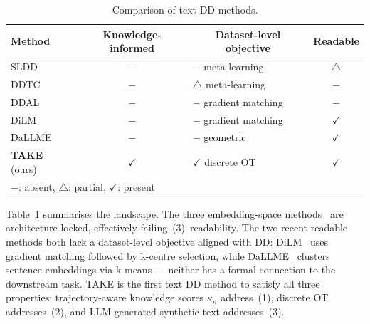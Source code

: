 \begin{table}[t] %
    \centering
    \caption{Comparison of text DD methods.}
    \label{ch5:tab:comparision-textdd-methods}
    \begin{tabular}{l c l c}
        \toprule
        \textbf{Method}                 & \quad Knowledge-informed \quad \quad & \multicolumn{1}{c}{Dataset-level objective \quad \quad} & Readable     \\
        \midrule
        SLDD~\cite{sucholutsky2021soft} & $-$                                  & $-$ meta-learning                                       & $\triangle$  \\
        DDTC~\cite{li2021data}          & $-$                                  & $\triangle$ meta-learning                               & $-$          \\
        DDAL~\cite{maekawa2023dataset}  & $-$                                  & $-$ gradient matching                                   & $-$          \\
        DiLM~\cite{maekawa2024dilm}     & $-$                                  & $-$ gradient matching                                   & $\checkmark$ \\
        DaLLME~\cite{tao2024textual}    & $-$                                  & $-$ geometric                                           & $\checkmark$ \\
        \textbf{TAKE} (ours)            & $\checkmark$                         & $\checkmark$ discrete OT                                & $\checkmark$ \\
        \bottomrule
        \multicolumn{4}{l}{$-$: absent, $\triangle$: partial, $\checkmark$: present}
    \end{tabular}
\end{table}

\begin{foldable} %
    Table~\ref{ch5:tab:comparision-textdd-methods} summarises the landscape.
    The three embedding-space methods~\cite{sucholutsky2021soft,li2021data,maekawa2023dataset} are architecture-locked, effectively failing~(3)~readability.
    The two recent readable methods both lack a dataset-level objective aligned with DD: DiLM~\cite{maekawa2024dilm} uses gradient matching followed by k-centre selection, while DaLLME~\cite{tao2024textual} clusters sentence embeddings via k-means --- neither has a formal connection to the downstream task.
    TAKE is the first text DD method to satisfy all three properties: trajectory-aware knowledge scores $\kappa_n$ address~(1), discrete OT addresses~(2), and LLM-generated synthetic text addresses~(3).
\end{foldable}


